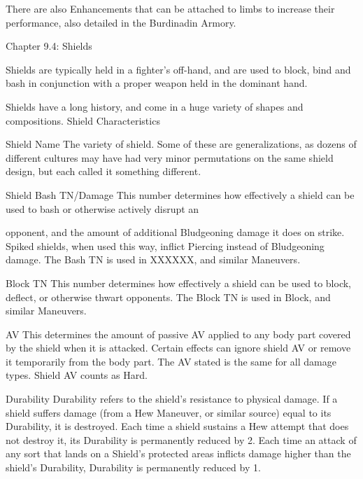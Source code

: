 \documentclass[oneside,11pt,english]{book}
\begin{document}
 

There are also Enhancements that can be attached to limbs to increase their performance, also detailed in 
the Burdinadin Armory. 
 
Chapter 9.4: Shields 

 

 

Shields are typically held in a fighter’s off-hand, and are used to block, bind and bash in conjunction with 
a proper weapon held in the dominant hand. 

 

Shields have a long history, and come in a huge variety of shapes and compositions. 
Shield Characteristics 

 

Shield Name 
The variety of shield. Some of these are generalizations, as dozens of different cultures may have had 
very minor permutations on the same shield design, but each called it something different. 

 

Shield Bash TN/Damage 
This number determines how effectively a shield can be used to bash or otherwise actively disrupt an 


opponent, and the amount of additional Bludgeoning damage it does on strike. Spiked shields, when used 
this way, inflict Piercing instead of Bludgeoning damage. The Bash TN is used in XXXXXX, and similar 
Maneuvers. 

 

Block TN 
This number determines how effectively a shield can be used to block, deflect, or otherwise thwart 
opponents. The Block TN is used in Block, and similar Maneuvers. 

 

AV 
This determines the amount of passive AV applied to any body part covered by the shield when it is 
attacked. Certain effects can ignore shield AV or remove it temporarily from the body part. The AV 
stated is the same for all damage types. 
Shield AV counts as Hard. 

 

Durability 
Durability refers to the shield’s resistance to physical damage. If a shield suffers damage (from a Hew 
Maneuver, or similar source) equal to its Durability, it is destroyed. Each time a shield sustains a Hew 
attempt that does not destroy it, its Durability is permanently reduced by 2. Each time an attack of any 
sort that lands on a Shield’s protected areas inflicts damage higher than the shield’s Durability, Durability 
is permanently reduced by 1. 
 
\end{document}
